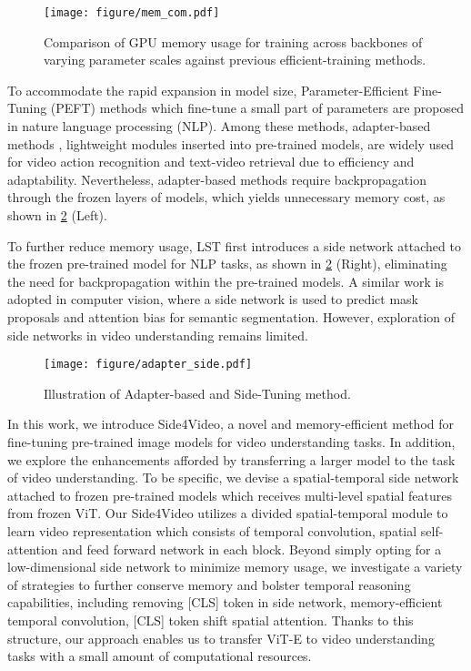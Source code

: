 \documentclass[10pt,twocolumn,letterpaper]{article}
\begin{document}
\begin{figure}[t]
  \centering
  \texttt{[image: figure/mem\_com.pdf]}
  \vspace{-5mm}
  \caption{Comparison of GPU memory usage for training across backbones of varying parameter scales against previous efficient-training methods.}
   \label{fig:figure1}
\end{figure}

To accommodate the rapid expansion in model size, Parameter-Efficient Fine-Tuning (PEFT) methods \cite{lora, PEFT4nlp,lst, bitfit, prompt_tuning4nlp} which fine-tune a small part of parameters are proposed in nature language processing (NLP). Among these methods, adapter-based methods \cite{st_adapter, aim, crossadapter, uniadapter}, lightweight modules inserted into pre-trained models, are widely used for video action recognition and text-video retrieval due to efficiency and adaptability. Nevertheless, adapter-based methods require backpropagation through the frozen layers of models, which yields unnecessary memory cost, as shown in \cref{fig:adapter_side-tuning} (Left).


To further reduce memory usage, LST \cite{lst} first introduces a side network attached to the frozen pre-trained model for NLP tasks, as shown in \cref{fig:adapter_side-tuning} (Right), eliminating the need for backpropagation within the pre-trained models. A similar work \cite{side_ss} is adopted in computer vision, where a side network is used to predict mask proposals and attention bias for semantic segmentation. However, exploration of side networks in video understanding remains limited.




\begin{figure}
    \centering
    \texttt{[image: figure/adapter\_side.pdf]}
    \vspace{-1mm}
    \caption{Illustration of Adapter-based and Side-Tuning method.}
    \label{fig:adapter_side-tuning}
\end{figure}

In this work, we introduce Side4Video, a novel and memory-efficient method for fine-tuning pre-trained image models for video understanding tasks. In addition, we explore the enhancements afforded by transferring a larger model to the task of video understanding. To be specific, we devise a spatial-temporal side network attached to frozen pre-trained models which receives multi-level spatial features from frozen ViT. Our Side4Video utilizes a divided spatial-temporal module to learn video representation which consists of temporal convolution, spatial self-attention and feed forward network in each block. Beyond simply opting for a low-dimensional side network to minimize memory usage, we investigate a variety of strategies to further conserve memory and bolster temporal reasoning capabilities, including removing [CLS] token in side network, memory-efficient temporal convolution, [CLS] token shift spatial attention. Thanks to this structure, our approach enables us to transfer ViT-E to video understanding tasks with a small amount of computational resources.
\end{document}
